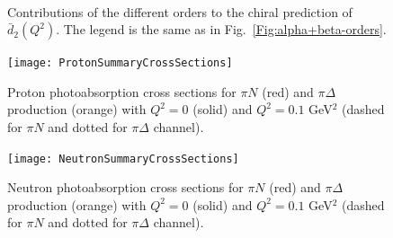 \documentclass[twocolumn,prc,showpacs,nofootinbib,preprintnumbers,amsmath,amssymb,superscriptaddress]{revtex4-1}
\begin{document}
\begin{figure}[H]
\begin{center} 
\hspace{-0.3cm}\\[0.5cm] \hspace{-0.3cm} 
\caption{Contributions of the different orders to the chiral prediction of $\bar{d}_2(Q^2)$. The legend is the same as in Fig.~\ref{Fig:alpha+beta-orders}. \label{Fig:d2-orders-plot}}
\end{center}
\end{figure}

\begin{widetext}

\begin{figure}[H]
\begin{center} 
\texttt{[image: ProtonSummaryCrossSections]}
\caption{Proton photoabsorption cross sections for $\pi N$ (red) and $\pi \Delta$ production (orange) with $Q^2=0$ (solid) and $Q^2=0.1$ GeV$^2$ (dashed for $\pi N$ and dotted for $\pi \Delta$ channel). \label{Fig:ProtonSummaryCrossSections}}
\end{center}
\end{figure}

\begin{figure}[H]
\begin{center} 
\texttt{[image: NeutronSummaryCrossSections]}
\caption{Neutron photoabsorption cross sections for $\pi N$ (red) and $\pi \Delta$ production (orange) with $Q^2=0$ (solid) and $Q^2=0.1$ GeV$^2$ (dashed for $\pi N$ and dotted for $\pi \Delta$ channel). \label{Fig:NeutronSummaryCrossSections}}
\end{center}
\end{figure}

\end{widetext}

\end{document}
